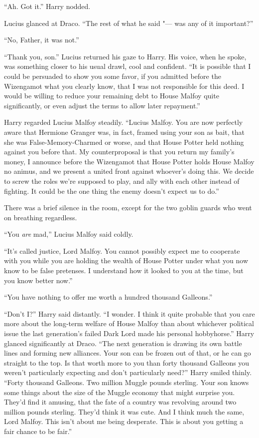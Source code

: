 ``Ah. Got it.'' Harry nodded.

Lucius glanced at Draco. ``The rest of what he said "--- was any of it
important?''

``No, Father, it was not.''

``Thank you, son.'' Lucius returned his gaze to Harry. His voice, when
he spoke, was something closer to his usual drawl, cool and confident.
``It is possible that I could be persuaded to show you some favor, if
you admitted before the Wizengamot what you clearly know, that I was not
responsible for this deed. I would be willing to reduce your remaining
debt to House Malfoy quite significantly, or even adjust the terms to
allow later repayment.''

Harry regarded Lucius Malfoy steadily. ``Lucius Malfoy. You are now
perfectly aware that Hermione Granger was, in fact, framed using your
son as bait, that she was False-Memory-Charmed or worse, and that House
Potter held nothing against you before that. My counterproposal is that
you return my family's money, I announce before the Wizengamot that
House Potter holds House Malfoy no animus, and we present a united front
against whoever's doing this. We decide to screw the roles we're
supposed to play, and ally with each other instead of fighting. It could
be the one thing the enemy doesn't expect us to do.''

There was a brief silence in the room, except for the two goblin guards
who went on breathing regardless.

``You \emph{are} mad,'' Lucius Malfoy said coldly.

``It's called justice, Lord Malfoy. You cannot possibly expect me to
cooperate with you while you are holding the wealth of House Potter
under what you now know to be false pretenses. I understand how it
looked to you at the time, but you know better now.''

``You have nothing to offer me worth a hundred thousand Galleons.''

``Don't I?'' Harry said distantly. ``I wonder. I think it quite probable
that you care more about the long-term welfare of House Malfoy than
about whichever political issue the last generation's failed Dark Lord
made his personal hobbyhorse.'' Harry glanced significantly at Draco.
``The next generation is drawing its own battle lines and forming new
alliances. Your son can be frozen out of that, or he can go straight to
the top. Is that worth more to you than forty thousand Galleons you
weren't particularly expecting and don't particularly need?'' Harry
smiled thinly. ``Forty thousand Galleons. Two million Muggle pounds
sterling. Your son knows some things about the size of the Muggle
economy that might surprise you. They'd find it amusing, that the fate
of a country was revolving around two million pounds sterling. They'd
think it was cute. And I think much the same, Lord Malfoy. This isn't
about me being desperate. This is about you getting a fair chance to be
fair.''

